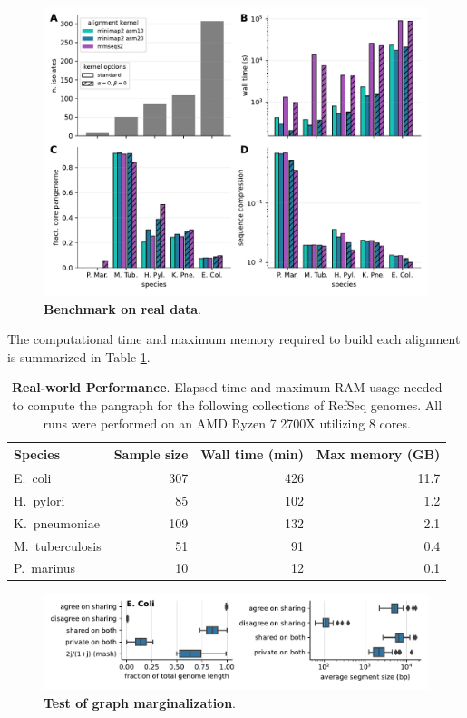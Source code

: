 \documentclass[aps,rmp,reprint,superscriptaddress,notitlepage,10pt]{revtex4-1}
\begin{document}
\begin{figure}[htb]
    \includegraphics[width=.7\textwidth]{figs/panx_benchmark.pdf}
    \caption{{\bf Benchmark on real data}.}
    \label{fig:panx-benchmark}
\end{figure}

The computational time and maximum memory required to build each alignment is summarized in Table \ref{table:panx-performance}.

\begin{table}[hb]
    \caption{{\bf Real-world Performance}.
    Elapsed time and maximum RAM usage needed to compute the pangraph for the following collections of RefSeq genomes.
    All runs were performed on an AMD Ryzen 7 2700X utilizing 8 cores.
    }
    \begin{tabular}{l r r r }
    \hline\hline
    Species & Sample size & Wall time (min) & Max memory (GB) \\
    \hline
    E.~coli         & 307 & 426 & 11.7 \\
    H.~pylori       & 85 & 102 & 1.2 \\
    K.~pneumoniae   & 109 & 132 & 2.1 \\
    M.~tuberculosis & 51 & 91 & 0.4 \\
    P.~marinus      & 10 & 12 & 0.1 \\
    \hline
    \end{tabular}
    \label{table:panx-performance}
\end{table}

\begin{figure}[htb]
    \includegraphics[width=.8\textwidth]{figs/proj_single_escherichia_coli.pdf}
    \caption{{\bf Test of graph marginalization}.}
    \label{fig:marginalization}
\end{figure}
\end{document}
